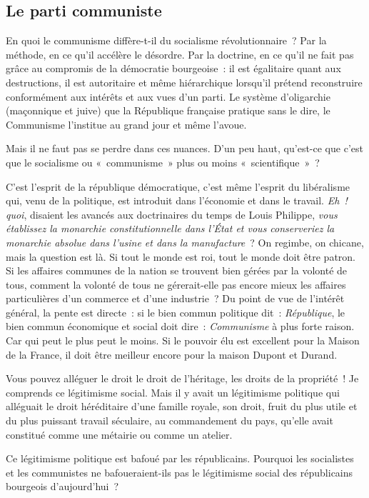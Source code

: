 \documentclass[french,twoside]{book} %
\newcommand{\astermono}{\medskip\centerline{\color{rubric}\large\selectfont{\syms ✻}}\medskip\par}%
\begin{document}
\astermono

\subsection[{Le parti communiste}]{Le parti communiste}
\noindent En quoi le communisme diffère-t-il du socialisme révolutionnaire ? Par la méthode, en ce qu’il accélère le désordre. Par la doctrine, en ce qu’il ne fait pas grâce au compromis de la démocratie bourgeoise : il est égalitaire quant aux destructions, il est autoritaire et même hiérarchique lorsqu’il prétend reconstruire conformément aux intérêts et aux vues d’un parti. Le système d’oligarchie (maçonnique et juive) que la République française pratique sans le dire, le Communisme l’institue au grand jour et même l’avoue.\par
Mais il ne faut pas se perdre dans ces nuances. D’un peu haut, qu’est-ce que c’est que le socialisme ou « communisme » plus ou moins « scientifique » ?\par
C’est l’esprit de la république démocratique, c’est même l’esprit du libéralisme qui, venu de la politique, est introduit dans l’économie et dans le travail. \emph{Eh ! quoi}, disaient les avancés aux doctrinaires du temps de Louis Philippe, \emph{vous établissez la monarchie constitutionnelle dans l’État et vous conserveriez la monarchie absolue dans l’usine et dans la manufacture} ? On regimbe, on chicane, mais la question est là. Si tout le monde est roi, tout le monde doit être patron. Si les affaires communes de la nation se trouvent bien gérées par la volonté de tous, comment la volonté de tous ne gérerait-elle pas encore mieux les affaires particulières d’un commerce et d’une industrie ? Du point de vue de l’intérêt général, la pente est directe : si le bien commun politique dit : \emph{République}, le bien commun économique et social doit dire : \emph{Communisme} à plus forte raison. Car qui peut le plus peut le moins. Si le pouvoir élu est excellent pour la Maison de la France, il doit être meilleur encore pour la maison Dupont et Durand.\par
Vous pouvez alléguer le droit le droit de l’héritage, les droits de la propriété ! Je comprends ce légitimisme social. Mais il y avait un légitimisme politique qui alléguait le droit héréditaire d’une famille royale, son droit, fruit du plus utile et du plus puissant travail séculaire, au commandement du pays, qu’elle avait constitué comme une métairie ou comme un atelier.\par
Ce légitimisme politique est bafoué par les républicains. Pourquoi les socialistes et les communistes ne bafoueraient-ils pas le légitimisme social des républicains bourgeois d’aujourd’hui ?\par
\end{document}
